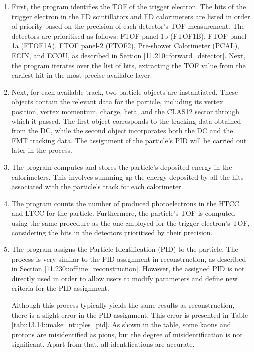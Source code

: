     \begin{enumerate}
        \item
            First, the program identifies the TOF of the trigger electron.
            The hits of the trigger electron in the FD scintillators and FD calorimeters are listed in order of priority based on the precision of each detector's TOF measurement.
            The detectors are prioritised as follows: FTOF panel-1b (FTOF1B), FTOF panel-1a (FTOF1A), FTOF panel-2 (FTOF2), Pre-shower Calorimeter (PCAL), ECIN, and ECOU, as described in Section \ref{11.210::forward_detector}.
            Next, the program iterates over the list of hits, extracting the TOF value from the earliest hit in the most precise available layer.

        \item
            Next, for each available track, two particle objects are instantiated.
            These objects contain the relevant data for the particle, including its vertex position, vertex momentum, charge, beta, and the CLAS12 sector through which it passed.
            The first object corresponds to the tracking data obtained from the DC, while the second object incorporates both the DC and the FMT tracking data.
            The assignment of the particle's PID will be carried out later in the process.

        \item
            The program computes and stores the particle's deposited energy in the calorimeters.
            This involves summing up the energy deposited by all the hits associated with the particle's track for each calorimeter.

        \item
            The program counts the number of produced photoelectrons in the HTCC and LTCC for the particle.
            Furthermore, the particle's TOF is computed using the same procedure as the one employed for the trigger electron's TOF, considering the hits in the detectors prioritised by their precision.

        \item
            The program assigns the Particle Identification (PID) to the particle.
            The process is very similar to the PID assignment in reconstruction, as described in Section \ref{11.230::offline_reconstruction}.
            However, the assigned PID is not directly used in order to allow users to modify parameters and define new criteria for the PID assignment.

            Although this process typically yields the same results as reconstruction, there is a slight error in the PID assignment.
            This error is presented in Table \ref{tab::13.14::make_ntuples_pid}.
            As shown in the table, some kaons and protons are misidentified as pions, but the degree of misidentification is not significant.
            Apart from that, all identifications are accurate.


\end{enumerate}
